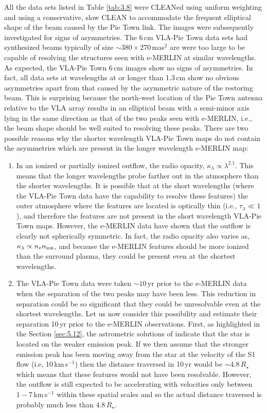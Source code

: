 All the data sets listed in Table \ref{tab:3.8} were CLEANed using uniform weighting and using a conservative, slow CLEAN to accommodate the frequent elliptical shape of the beam caused by the Pie Town link. The images were subsequently investigated for signs of asymmetries. The 6\,cm VLA-Pie Town data sets had synthesized beams typically of size $\sim 380\times 270$\,mas$^2$ are were too large to be capable of resolving the structures seen with e-MERLIN at similar wavelengths. As expected, the VLA-Pie Town 6\,cm images show no signs of asymmetries. In fact, all data sets at wavelengths at or longer than 1.3\,cm show no obvious asymmetries apart from that caused by the asymmetric nature of the restoring beam. This is surprising because the north-west location of the Pie Town antenna relative to the VLA array results in an elliptical beam with a semi-minor axis lying in the same direction as that of the two peaks seen with e-MERLIN, i.e., the beam shape should be well suited to resolving these peaks. There are two possible reasons why the shorter wavelength VLA-Pie Town maps do not contain the asymmetries which are present in the longer wavelength e-MERLIN map:
\begin{enumerate}
\item In an ionized or partially ionized outflow, the radio opacity, $\kappa _{\lambda} \propto \lambda ^{2.1}$. This means that the longer wavelengths probe farther out in the atmosphere than the shorter wavelengths. It is possible that at the short wavelengths (where the VLA-Pie Town data have the capability to resolve these features) the outer atmosphere where the features are located is optically thin (i.e., $\tau _{\lambda}\ll 1$), and therefore the features are not present in the short wavelength VLA-Pie Town maps. However, the e-MERLIN data have shown that the outflow is clearly not spherically symmetric. In fact, the radio opacity also varies as, $\kappa _{\lambda} \propto n_{e}n_{\rm{ion}}$, and because the e-MERLIN features should be more ionized than the surround plasma, they could be present even at the shortest wavelengths.
\item The VLA-Pie Town data were taken $\sim 10$\,yr prior to the e-MERLIN data when the separation of the two peaks may have been less. This reduction in separation could be so significant that they could be unresolvable even at the shortest wavelengths. Let us now consider this possibility and estimate their separation  10\,yr prior to the e-MERLIN observations. First, as highlighted in the Section \ref{sec:5.12}, the astrometric solutions of \cite{harper_2008} indicate that the star is located on the weaker emission peak. If we then assume that the stronger emission peak has been moving away from the star at the velocity of the S1 flow (i.e, 10\,km\,s$^{-1}$) then the distance traversed in 10\,yr would be $\sim 4.8\,R_{\star}$ which means that these features would not have been resolvable. However, the outflow is still expected to be accelerating with velocities only between $1-7$\,km\,s$^{-1}$ within these spatial scales \citep{carpenter_1997} and so the actual distance traversed is probably much less than $4.8\,R_{\star}$.
\end{enumerate}

